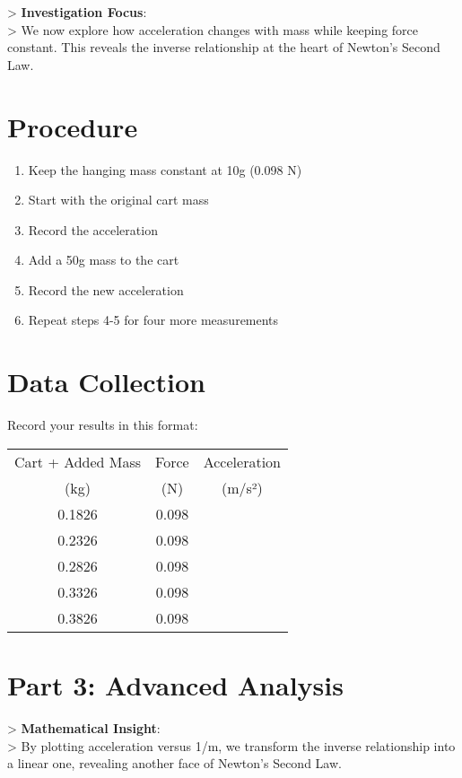 \documentclass[12pt]{article}
\begin{document}
> \textbf{Investigation Focus}:\\
> We now explore how acceleration changes with mass while keeping force constant. This reveals the inverse relationship at the heart of Newton's Second Law.

\section*{Procedure}
\begin{enumerate}[label=\arabic*.]
\item Keep the hanging mass constant at 10g (0.098 N)
\item Start with the original cart mass
\item Record the acceleration
\item Add a 50g mass to the cart
\item Record the new acceleration
\item Repeat steps 4-5 for four more measurements
\end{enumerate}

\section*{Data Collection}
Record your results in this format:

\begin{table}[H]
\centering
\begin{tabular}{ccc}
\toprule
Cart + Added Mass & Force & Acceleration \\
(kg) & (N) & (m/s²) \\
\midrule
0.1826 & 0.098 & \\
0.2326 & 0.098 & \\
0.2826 & 0.098 & \\
0.3326 & 0.098 & \\
0.3826 & 0.098 & \\
\bottomrule
\end{tabular}
\end{table}

\section*{Part 3: Advanced Analysis}

> \textbf{Mathematical Insight}:\\
> By plotting acceleration versus 1/m, we transform the inverse relationship into a linear one, revealing another face of Newton's Second Law.
\end{document}
